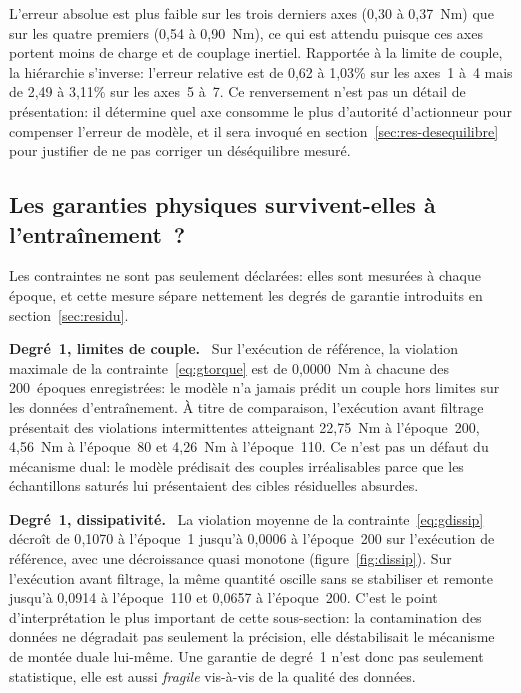 \documentclass[a4paper, oneside]{article}
\newcommand{\parag}[1]{%
    \par\medskip\noindent\textbf{#1}\ \ignorespaces%
}
\begin{document}
L'erreur absolue est plus faible sur les trois derniers axes (0{,}30 à
0{,}37~Nm) que sur les quatre premiers (0{,}54 à 0{,}90~Nm), ce qui est attendu
puisque ces axes portent moins de charge et de couplage inertiel. Rapportée à la
limite de couple, la hiérarchie s'inverse: l'erreur relative est de 0{,}62 à
1{,}03\% sur les axes~1 à~4 mais de 2{,}49 à 3{,}11\% sur les axes~5 à~7. Ce
renversement n'est pas un détail de présentation: il détermine quel axe
consomme le plus d'autorité d'actionneur pour compenser l'erreur de modèle, et
il sera invoqué en section~\ref{sec:res-desequilibre} pour justifier de ne pas
corriger un déséquilibre mesuré.

\subsection{Les garanties physiques survivent-elles à l'entraînement~?}
\label{sec:res-physique}

Les contraintes ne sont pas seulement déclarées: elles sont mesurées à chaque
époque, et cette mesure sépare nettement les degrés de garantie introduits en
section~\ref{sec:residu}.

\parag{Degré~1, limites de couple.} Sur l'exécution de référence, la
violation maximale de la contrainte~\eqref{eq:gtorque} est de 0{,}0000~Nm à
chacune des 200~époques enregistrées: le modèle n'a jamais prédit un couple
hors limites sur les données d'entraînement. À titre de comparaison,
l'exécution avant filtrage présentait des violations intermittentes atteignant
22{,}75~Nm à l'époque~200, 4{,}56~Nm à l'époque~80 et 4{,}26~Nm à l'époque~110.
Ce n'est pas un défaut du mécanisme dual: le modèle prédisait des couples
irréalisables parce que les échantillons saturés lui présentaient des cibles
résiduelles absurdes.

\parag{Degré~1, dissipativité.} La violation moyenne de la
contrainte~\eqref{eq:gdissip} décroît de 0{,}1070 à l'époque~1 jusqu'à 0{,}0006
à l'époque~200 sur l'exécution de référence, avec une décroissance quasi
monotone (figure~\ref{fig:dissip}). Sur l'exécution avant filtrage, la même
quantité oscille sans se stabiliser et remonte jusqu'à 0{,}0914 à l'époque~110
et 0{,}0657 à l'époque~200. C'est le point d'interprétation le plus important
de cette sous-section: la contamination des données ne dégradait pas seulement
la précision, elle déstabilisait le mécanisme de montée duale lui-même. Une
garantie de degré~1 n'est donc pas seulement statistique, elle est aussi
\emph{fragile} vis-à-vis de la qualité des données.
\end{document}
